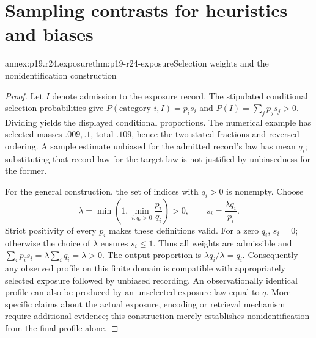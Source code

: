 \section{Sampling contrasts for heuristics and biases}
\label{sec:annex-p19-rationality-2-4}

\begin{annexitem}{annex:p19.r24.exposure}{thm:p19-r24-exposure}{Selection weights and the nonidentification construction}
\begin{proof}
Let \(I\) denote admission to the exposure record. The stipulated
conditional selection probabilities give
\(P(\text{category }i,I)=p_i s_i\) and
\(P(I)=\sum_j p_j s_j>0\). Dividing yields the displayed
conditional proportions. The numerical example has selected masses
\(.009,.1\), total \(.109\), hence the two stated fractions
and reversed ordering. A sample estimate unbiased for the admitted
record's law has mean \(q_i\); substituting that record law for the
target law is not justified by unbiasedness for the former.

For the general construction, the set of indices with \(q_i>0\)
is nonempty. Choose
\[
 \lambda=\min\left(1,\min_{i:q_i>0}\frac{p_i}{q_i}\right)>0,
 \qquad s_i=\frac{\lambda q_i}{p_i}.
\]
Strict positivity of every \(p_i\) makes these definitions valid.
For a zero \(q_i\), \(s_i=0\); otherwise the choice of
\(\lambda\) ensures \(s_i\leq1\). Thus all weights are
admissible and \(\sum_i p_i s_i=\lambda\sum_i q_i=\lambda>0\).
The output proportion is \(\lambda q_i/\lambda=q_i\).
Consequently any observed profile on this finite domain is compatible
with appropriately selected exposure followed by unbiased recording.
An observationally identical profile can also be produced by an
unselected exposure law equal to \(q\). More specific claims about
the actual exposure, encoding or retrieval mechanism require additional
evidence; this construction merely establishes nonidentification from
the final profile alone.
\end{proof}
\end{annexitem}


